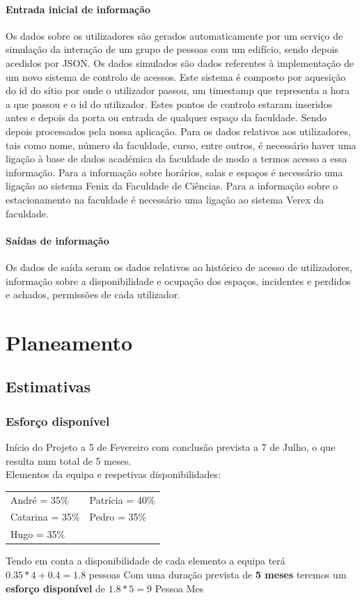 \documentclass[a4paper]{report}
\begin{document}
\subsubsection*{Entrada inicial de informação}
    Os dados sobre os utilizadores são gerados automaticamente por um serviço de simulação da interação de um grupo de pessoas com um edifício, sendo depois acedidos por JSON.
	Os dados simulados são dados referentes à implementação de um novo sistema de controlo de acessos. Este sistema é composto por aquesição do id do sítio por onde o utilizador passou, um timestamp que representa a hora a que passou e o id do utilizador. Estes pontos de controlo estaram inseridos antes e depois da porta ou entrada de qualquer espaço da faculdade. Sendo depois processados pela nossa aplicação. Para os dados relativos aos utilizadores, tais como nome, número da faculdade, curso, entre outros, é necessário haver uma ligação à base de dados académica da faculdade de modo a termos acesso a essa informação. Para a informação sobre horários, salas e espaços é necessário uma ligação ao sistema Fenix da Faculdade de Ciências. Para a informação sobre o estacionamento na faculdade é necessário uma ligação ao sistema Verex da faculdade.
\subsubsection*{Saídas de informação}
	Os dados de saída seram os dados relativos ao histórico de acesso de utilizadores, informação sobre a disponibilidade e ocupação dos espaços, incidentes e perdidos e achados, permissões de cada utilizador.  
\chapter{Planeamento}
\section{Estimativas}
\subsection{Esforço disponível}
Início do Projeto a 5 de Fevereiro com conclusão prevista a 7 de Julho, o que resulta num total de 5 meses.\\
Elementos da equipa e respetivas disponibilidades:\\

\begin{tabularx}{\textwidth}{XX}
	André = 35\%    & Patrícia = 40\% \\
	Catarina = 35\% & Pedro = 35\%    \\
	Hugo = 35\%     &
\end{tabularx}
\linebreak\linebreak
Tendo em conta a disponibilidade de cada elemento a equipa terá $0.35*4 + 0.4 =1.8$ pessoas\linebreak
Com uma duração prevista de \textbf{5 meses} teremos um \textbf{esforço disponível} de $1.8*5=9$ Pessoa Mes
\end{document}
